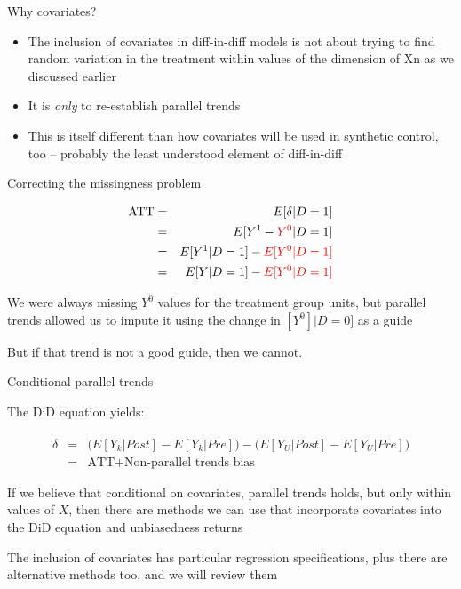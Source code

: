 \documentclass{beamer}
\begin{document}
\begin{frame}{Why covariates?}

\begin{itemize}

\item The inclusion of covariates in diff-in-diff models is not about trying to find random variation in the treatment within values of the dimension of Xn as we discussed earlier
\item It is \emph{only} to re-establish parallel trends
\item This is itself different than how covariates will be used in synthetic control, too -- probably the least understood element of diff-in-diff
\end{itemize}

\end{frame}

\begin{frame}{Correcting the missingness problem}

\begin{eqnarray*}
\text{ATT} &=& E[\delta | D=1] \\
&=& E[Y^1-\textcolor{red}{Y^0} | D=1] \\
&=& E[Y^1 | D=1] - \textcolor{red}{E[Y^0|D=1]} \\
&=& E[Y | D=1] - \textcolor{red}{E[Y^0|D=1]} 
\end{eqnarray*}

\bigskip

We were always missing $Y^0$ values for the treatment group units, but parallel trends allowed us to impute it using the change in $[Y^0]|D=0]$ as a guide

\bigskip

But if that trend is not a good guide, then we cannot.  


\end{frame}


\begin{frame}{Conditional parallel trends}

The DiD equation yields:

\begin{eqnarray*}
\widehat{\delta} &=& \bigg ( E[Y_k|Post] - E[Y_k|Pre] \bigg ) - \bigg ( E[Y_U | Post ] - E[ Y_U | Pre] \bigg) \\
&=& \text{ATT} + \text{Non-parallel trends bias}
\end{eqnarray*}

\bigskip

If we believe that conditional on covariates, parallel trends holds, but only within values of $X$, then there are methods we can use that incorporate covariates into the DiD equation and unbiasedness returns

\bigskip 

The inclusion of covariates has particular regression specifications, plus there are alternative methods too, and we will review them

\end{frame}
\end{document}
